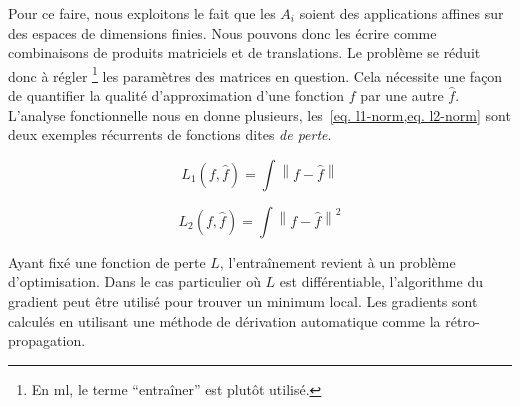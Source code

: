 Pour ce faire, nous exploitons le fait que 
les \(A_i\) soient des applications affines sur des espaces de dimensions finies.
Nous pouvons donc les écrire comme combinaisons de produits matriciels et de translations.
Le problème se réduit donc à régler \footnote{En \gls{ml}, le terme ``entraîner'' est plutôt utilisé.}
les paramètres des matrices en question. 
Cela nécessite une façon de quantifier la qualité d'approximation d'une fonction \(f\) par une autre \(\hat{f}\).
L'analyse fonctionnelle nous en donne plusieurs, les~\cref{eq. l1-norm,eq. l2-norm}
sont deux exemples récurrents de fonctions dites \emph{de perte}.

\begin{equation}
    \label{eq. l1-norm}
    L_1(f, \hat{f}) = \int \left\|f - \hat{f}\right\|
\end{equation}

\begin{equation}
    \label{eq. l2-norm}
    L_2(f, \hat{f}) = \int \left\|f - \hat{f}\right\|^2
\end{equation}

Ayant fixé une fonction de perte \(L\), l'entraînement revient à un problème d'optimisation.
Dans le cas particulier où \(L\) est différentiable, 
l'algorithme du gradient peut être utilisé pour trouver un minimum local.
Les gradients sont calculés en utilisant une méthode de dérivation automatique comme la rétro-propagation.
